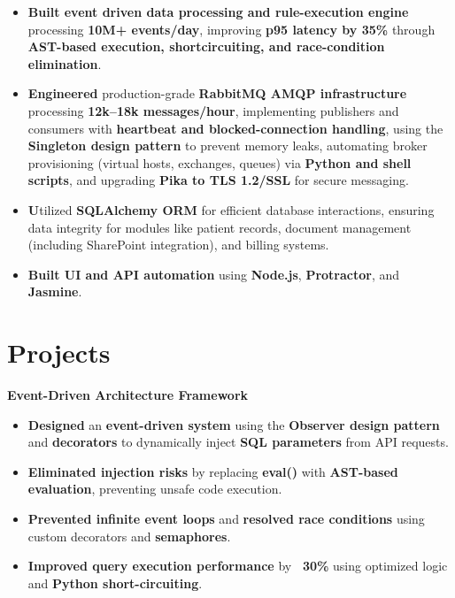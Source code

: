 \documentclass[11 pt]{article}
\begin{document}
\begin{itemize}
\item \textbf{Built event driven data processing and rule-execution engine} processing \textbf{10M+ events/day}, improving \textbf{p95 latency by 35\%} through \textbf{AST-based execution, shortcircuiting, and race-condition elimination}.

\item \textbf{Engineered }production-grade\textbf{ RabbitMQ AMQP infrastructure} processing \textbf{12k--18k messages/hour}, implementing publishers and consumers with \textbf{heartbeat and blocked-connection handling}, using the \textbf{Singleton design pattern} to prevent memory leaks, automating broker provisioning (virtual hosts, exchanges, queues) via \textbf{Python and shell scripts}, and upgrading \textbf{Pika to TLS 1.2/SSL} for secure messaging.

\item \textbf Utilized \textbf{SQLAlchemy ORM} for efficient database interactions, ensuring data integrity for modules like patient records, document management (including SharePoint integration), and billing systems.

\item \textbf{Built UI and API automation} using \textbf{Node.js}, \textbf{Protractor}, and \textbf{Jasmine}.
\end{itemize}




\section*{\textbf{Projects}}

\noindent\textbf{Event-Driven Architecture Framework}
\begin{itemize}
  \item \textbf{Designed} an \textbf{event-driven system} using the \textbf{Observer design pattern} and \textbf{decorators} to dynamically inject \textbf{SQL parameters} from API requests.
  \item \textbf{Eliminated injection risks} by replacing \textbf{eval()} with \textbf{AST-based evaluation}, preventing unsafe code execution.
  \item \textbf{Prevented infinite event loops} and \textbf{resolved race conditions} using custom decorators and \textbf{semaphores}.
  \item \textbf{Improved query execution performance} by \textbf{~30\%} using optimized logic and \textbf{Python short-circuiting}.
\end{itemize}
\vspace{6pt}
\end{document}
